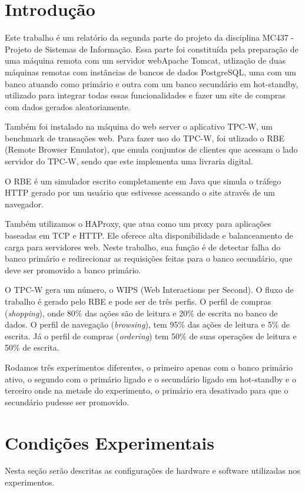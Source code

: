 \documentclass[11pt,twoside]{article}
\begin{document}
\section{Introdução}
Este trabalho \'e um relat\'orio da segunda parte do projeto da disciplina MC437 - Projeto de Sistemas de Informação. Essa parte foi constituída pela preparação de uma m\'aquina remota com um servidor  webApache Tomcat, utlização de duas máquinas remotas com instâncias de bancos de dados PostgreSQL, uma com um banco atuando como primário e outra com um banco secundário em hot-standby, utilizado para integrar todas essas funcionalidades e fazer um site de compras com dados gerados aleatoriamente.

    Também foi instalado na máquina do web server o aplicativo TPC-W, um benchmark de transa\c{c}\~oes web. Para fazer uso do TPC-W, foi utlizado o RBE (Remote Browser Emulator), que emula conjuntos de clientes que acessam o lado servidor do TPC-W, sendo que este implementa uma livraria digital.

    O RBE \'e um simulador escrito completamente em Java que simula o tr\'afego HTTP gerado por um usu\'ario que estivesse acessando o site atrav\'es de um navegador.

    Também utilizamos o HAProxy, que atua como um proxy para aplicações baseadas em TCP e HTTP. Ele oferece alta disponibilidade e balanceamento de carga para servidores web. Neste trabalho, sua função é de detectar falha do banco primário e redirecionar as requisições feitas para o banco secundário, que deve ser promovido a banco primário.

    O TPC-W gera um n\'umero, o WIPS (Web Interactions per Second). O fluxo de trabalho é gerado pelo RBE e pode ser de tr\^es perfis. O perfil de compras (\textit{shopping}), onde 80\% das a\c{c}\~oes são de leitura e 20\% de escrita no banco de dados. O perfil de navega\c{c}\~ao (\textit{browsing}), tem 95\% das a\c{c}\~oes de leitura e 5\% de escrita. J\'a o perfil de compras (\textit{ordering}) tem 50\% de suas opera\c{c}\~oes de leitura e 50\% de escrita.

    Rodamos três experimentos diferentes, o primeiro apenas com o banco primário ativo, o segundo com o primário ligado e o secundário ligado em hot-standby e o terceiro onde na metade do experimento, o primário era desativado para que o secundário pudesse ser promovido.

\setlength{\parindent}{4ex}


\section{Condições Experimentais}
\setlength{\parindent}{4ex}
     Nesta se\c{c}\~ao ser\~ao descritas as configura\c{c}\~oes de hardware e software utilizadas nos experimentos.
\end{document}
